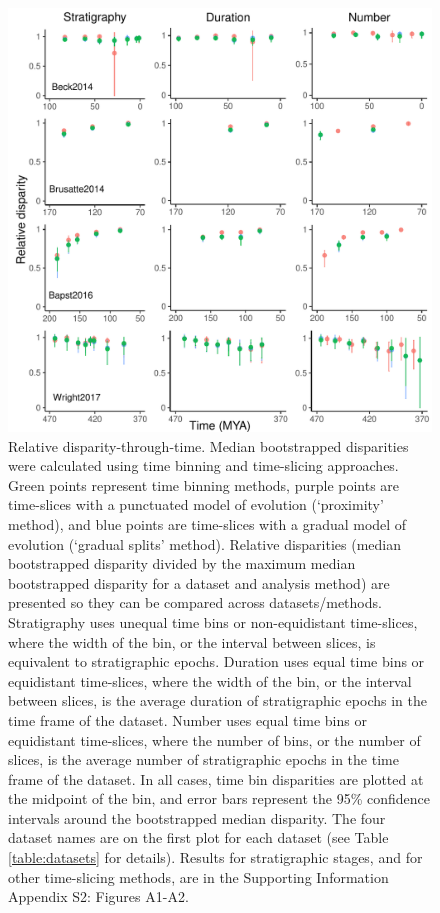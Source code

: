 \documentclass[12pt,a4paper]{article}
\begin{document}
\begin{figure}[!htbp]
    \centering
    \includegraphics[width=1\linewidth, height=1\textheight, keepaspectratio]{figures/fig-dtt-epoch.pdf}
    \caption[Relative disparity-through-time.]
    {Relative disparity-through-time. Median bootstrapped disparities were calculated using time binning and time-slicing approaches. 
    Green points represent time binning methods, purple points are time-slices with a punctuated model of evolution (`proximity' method), and blue points are time-slices with a gradual model of evolution (`gradual splits' method).
    Relative disparities (median bootstrapped disparity divided by the maximum median bootstrapped disparity for a dataset and analysis method) are presented so they can be compared across datasets/methods. 
    Stratigraphy uses unequal time bins or non-equidistant time-slices, where the width of the bin, or the interval between slices, is equivalent to stratigraphic epochs. 
    Duration uses equal time bins or equidistant time-slices, where the width of the bin, or the interval between slices, is the average duration of stratigraphic epochs in the time frame of the dataset. 
    Number uses equal time bins or equidistant time-slices, where the number of bins, or the number of slices, is the average number of stratigraphic epochs in the time frame of the dataset. 
    In all cases, time bin disparities are plotted at the midpoint of the bin, and error bars represent the 95\% confidence intervals around the bootstrapped median disparity.
    The four dataset names are on the first plot for each dataset (see Table \ref{table:datasets} for details).
    Results for stratigraphic stages, and for other time-slicing methods, are in the Supporting Information Appendix S2: Figures A1-A2.}
    \label{figure:dtt1}
\end{figure}
\end{document}

